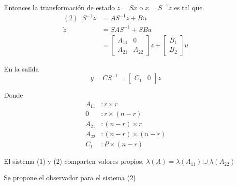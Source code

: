 Entonces la transformación de estado \( z = Sx\) o \( x = S^{-1}z \) es tal que
\[
    \begin{split}
        (2) \;\; S^{-1}\dot{z} & = AS^{-1}z + Bu \\
        \dot{z} & =SAS^{-1} + SBu \\
        & = \begin{bmatrix}
                A_{11} & 0\\
                A_{21} & A_{22}
            \end{bmatrix} z
            +
            \begin{bmatrix}
                B_{1} \\ B_{2}
            \end{bmatrix} u
    \end{split}
\]

En la salida
\[
    y = CS^{-1} = 
        \begin{bmatrix}
            C_{1} & 0    
        \end{bmatrix} z
\]

Donde 
\[
    \begin{split}
        A_{11} & : r \times r \\
        0 & : r \times (n-r) \\
        A_{21} & : (n-r) \times r \\
        A_{22} & : (n-r) \times (n-r) \\
        C_{1} & : P \times (n-r)
    \end{split} 
\]

El sistema (1) y (2) comparten valores propios, \( \lambda(A) = \lambda(A_{11}) \cup \lambda(A_{22}) \)

Se propone el observador para el sistema (2)

